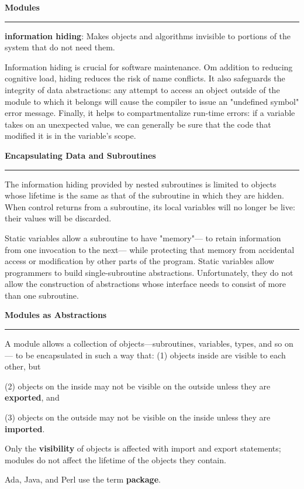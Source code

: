 \nopagenumbers
{\bf Modules}
\vskip 1mm
\hrule

\vskip 6pt
{\bf information hiding}: Makes objects and algorithms invisible to portions of the system that do not need them.

\vskip 6pt
Information hiding is crucial for software maintenance. Om addition to reducing cognitive load, hiding reduces the risk of name conflicts. It also safeguards the integrity of data abstractions: any attempt to access an object outside of the module to which it belongs will cause the compiler to issue an "undefined symbol" error message. Finally, it helps to compartmentalize run-time errors: if a variable takes on an unexpected value, we can generally be sure that the code that modified it is in the variable's scope.

\vskip 12pt
{\bf Encapsulating Data and Subroutines}
\vskip 1mm
\hrule

\vskip 6pt
The information hiding provided by nested subroutines is limited to objects whose lifetime is the same as that of the subroutine in which they are hidden. When control returns from a subroutine, its local variables will no longer be live: their values will be discarded.

\vskip 6pt
Static variables allow a subroutine to have "memory"--- to retain information from one invocation to the next--- while protecting that memory from accidental access or modification by other parts of the program. Static variables allow programmers to build single-subroutine abstractions. Unfortunately, they do not allow the construction of abstractions whose interface needs to consist of more than one subroutine.

\vskip 12pt
{\bf Modules as Abstractions}
\vskip 1mm
\hrule

\vskip 6pt
A module allows a collection of objects---subroutines, variables, types, and so on--- to be encapsulated in such a way that:
\vskip 6pt
(1) objects inside are visible to each other, but

\vskip 1mm
(2) objects on the inside may not be visible on the outside unless they are {\bf exported}, and

\vskip 1mm
(3) objects on the outside may not be visible on the inside unless they are {\bf imported}.

\vskip 6pt
Only the {\bf visibility} of objects is affected with import and export statements; modules do not affect the lifetime of the objects they contain.

\vskip 6pt
Ada, Java, and Perl use the term {\bf package}.

